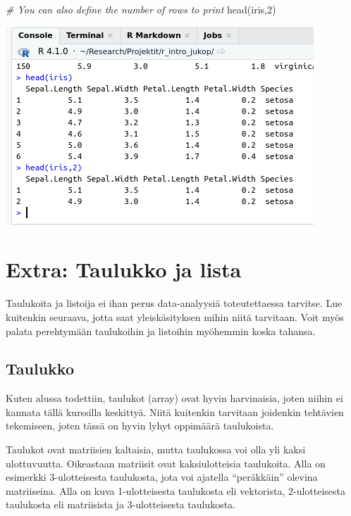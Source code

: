 \documentclass[
]{book}
\newenvironment{Shaded}{\begin{snugshade}}{\end{snugshade}}
\newcommand{\CommentTok}[1]{\textcolor[rgb]{0.56,0.35,0.01}{\textit{#1}}}
\newcommand{\DecValTok}[1]{\textcolor[rgb]{0.00,0.00,0.81}{#1}}
\newcommand{\FunctionTok}[1]{\textcolor[rgb]{0.00,0.00,0.00}{#1}}
\newcommand{\NormalTok}[1]{#1}
\begin{document}
\begin{Shaded}
\begin{Highlighting}[]
\CommentTok{\# You can also define the number of rows to print}
\FunctionTok{head}\NormalTok{(iris,}\DecValTok{2}\NormalTok{)}
\end{Highlighting}
\end{Shaded}

\includegraphics{files/02-data_types/iris_print_head2_data.png}

\hypertarget{extra-taulukko-ja-lista}{%
\section{Extra: Taulukko ja lista}\label{extra-taulukko-ja-lista}}

Taulukoita ja listoija ei ihan perus data-analyysiä toteutettaessa tarvitse. Lue kuitenkin seuraava, jotta saat yleiskäsityksen mihin niitä tarvitaan. Voit myös palata perehtymään taulukoihin ja listoihin myöhemmin koska tahansa.

\hypertarget{taulukko}{%
\subsection{Taulukko}\label{taulukko}}

Kuten alussa todettiin, taulukot (array) ovat hyvin harvinaisia, joten niihin ei kannata tällä kurssilla keskittyä. Niitä kuitenkin tarvitaan joidenkin tehtävien tekemiseen, joten tässä on hyvin lyhyt oppimäärä taulukoista.

Taulukot ovat matriisien kaltaisia, mutta taulukossa voi olla yli kaksi ulottuvuutta. Oikeastaan matriisit ovat kaksiulotteisia taulukoita. Alla on esimerkki 3-ulotteisesta taulukosta, jota voi ajatella ``peräkkäin'' olevina matriiseina. Alla on kuva 1-ulotteisesta taulukosta eli vektorista, 2-ulotteisesta taulukosta eli matriisista ja 3-ulotteisesta taulukosta.
\end{document}

